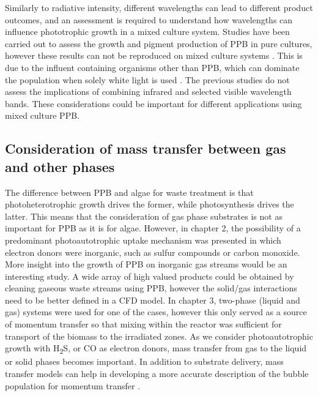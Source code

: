 \skippingparagraph
Similarly to radiative intensity, different wavelengths can lead to different product outcomes, and an assessment is required to understand how wavelengths can influence phototrophic growth in a mixed culture system. Studies have been carried out to assess the growth and pigment production of PPB in pure cultures, however these results can not be reproduced on mixed culture systems \cite{kuo2012}. This is due to the influent containing organisms other than PPB, which can dominate the population when solely white light is used \cite{hulsen2015}. The previous studies do not assess the implications of combining infrared and selected visible wavelength bands. These considerations could be important for different applications using mixed culture PPB. 


\subsection{Consideration of mass transfer between gas and other phases}
The difference between PPB and algae for waste treatment is that photoheterotrophic growth drives the former, while photosynthesis drives the latter. This means that the consideration of gas phase substrates is not as important for PPB as it is for algae. However, in chapter 2, the possibility of a predominant photoautotrophic uptake mechanism was presented in which electron donors were inorganic, such as sulfur compounds or carbon monoxide. More insight into the growth of PPB on inorganic gas streams would be an interesting study. A wide array of high valued products could be obtained by cleaning gaseous waste streams using PPB, however the solid/gas interactions need to be better defined in a CFD model. In chapter 3, two-phase (liquid and gas) systems were used for one of the cases, however this only served as a source of momentum transfer so that mixing within the reactor was sufficient for transport of the biomass to the irradiated zones. As we consider photoautotrophic growth with H\textsubscript{2}S, or CO as electron donors, mass transfer from gas to the liquid or solid phases becomes important. In addition to substrate delivery, mass transfer models can help in developing a more accurate description of the bubble population for momentum transfer \cite{krishna2003}.

